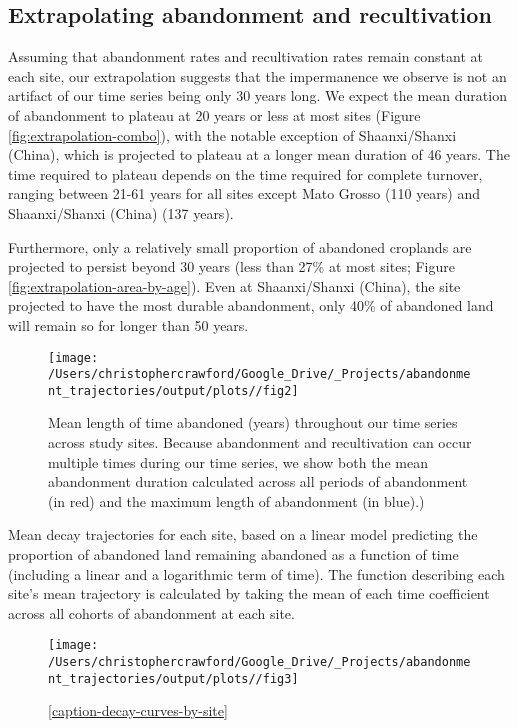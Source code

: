 \documentclass[9pt,twocolumn,twoside,]{pnas-new}
\begin{document}
\hypertarget{extrapolating-abandonment-and-recultivation}{%
\subsection{Extrapolating abandonment and
recultivation}\label{extrapolating-abandonment-and-recultivation}}

Assuming that abandonment rates and recultivation rates remain constant
at each site, our extrapolation suggests that the impermanence we
observe is not an artifact of our time series being only 30 years long.
We expect the mean duration of abandonment to plateau at 20 years or
less at most sites (Figure \ref{fig:extrapolation-combo}), with the
notable exception of Shaanxi/Shanxi (China), which is projected to
plateau at a longer mean duration of 46 years. The time required to
plateau depends on the time required for complete turnover, ranging
between 21-61 years for all sites except Mato Grosso (110 years) and
Shaanxi/Shanxi (China) (137 years).

Furthermore, only a relatively small proportion of abandoned croplands
are projected to persist beyond 30 years (less than 27\% at most sites;
Figure \ref{fig:extrapolation-area-by-age}). Even at Shaanxi/Shanxi
(China), the site projected to have the most durable abandonment, only
40\% of abandoned land will remain so for longer than 50 years.


\begin{figure}
\texttt{[image: /Users/christophercrawford/Google\_Drive/\_Projects/abandonment\_trajectories/output/plots//fig2]} 
\caption{Mean length of time abandoned (years) throughout our time series across study sites. Because abandonment and
recultivation can occur multiple times during our time series, we show both the mean abandonment duration calculated across all periods of abandonment (in red) and the maximum length of abandonment (in blue).)}
\label{fig:mean-abn-duration}
\end{figure}

\label{caption-decay-curves-by-site} Mean decay trajectories for each
site, based on a linear model predicting the proportion of abandoned
land remaining abandoned as a function of time (including a linear and a
logarithmic term of time). The function describing each site's mean
trajectory is calculated by taking the mean of each time coefficient
across all cohorts of abandonment at each site.

\begin{figure*}
\texttt{[image: /Users/christophercrawford/Google\_Drive/\_Projects/abandonment\_trajectories/output/plots//fig3]} 
\caption{\ref{caption-decay-curves-by-site}}
\label{fig:decay-curves-by-site}
\end{figure*}
\end{document}

